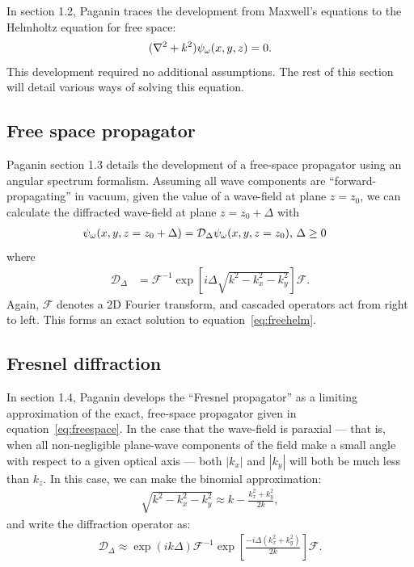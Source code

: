 \documentclass{article}
\begin{document}
In section 1.2, Paganin traces the development from Maxwell's equations to the
Helmholtz equation for free space:
\begin{align}
  (\nabla^2 + k^2)\psi_{\omega}(x,y,z) = 0.
  \label{eq:freehelm}
\end{align}
This development required no additional assumptions. The rest of this
section will detail various ways of solving this equation.

\subsection{Free space propagator}\label{freespace}
Paganin section 1.3 details the development of a free-space propagator using an
angular spectrum formalism. Assuming all wave components are
``forward-propagating'' in vacuum, given the value of a wave-field at plane
$z=z_0$, we can calculate the diffracted wave-field at plane $z=z_0 + \Delta$ with
\begin{align}
  \label{eq:propagated}
  \psi_{\omega}(x,y,z=z_0 + \Delta) &= \mathcal{D}_{\Delta}\psi_{\omega}(x,y,z=z_0) \text{,  } \Delta \ge 0
\end{align}
where
\begin{align}
  \mathcal{D}_{\Delta} &= \mathcal{F}^{-1}\exp\left[i\Delta\sqrt{k^2 - k_x^2 - k_y^2}\right]\mathcal{F}.\label{eq:freespace}
\end{align}
Again, $\mathcal{F}$ denotes a 2D Fourier transform, and cascaded operators act
from right to left. This forms an exact solution to equation~\ref{eq:freehelm}.

\subsection{Fresnel diffraction}
In section 1.4, Paganin develops the ``Fresnel propagator'' as a limiting
approximation of the exact, free-space propagator given in
equation~\ref{eq:freespace}. In the case that the wave-field is
paraxial --- that is, when all non-negligible plane-wave components of
the field make a small angle with respect to a given optical axis --- both
$|k_x|$ and $|k_y|$ will both be much less than $k_z$. In this case,
we can make the binomial approximation:
\begin{align}
  \sqrt{k^2 - k_x^2 - k_y^2} \approx k - \frac{k_x^2 + k_y^2}{2k},
\end{align}
and write the diffraction operator as:
\begin{align}
  \mathcal{D}_{\Delta} \approx \exp\left(ik\Delta\right)\mathcal{F}^{-1}\exp\left[\frac{-i\Delta\left(k_x^2 + k_y^2\right)}{2k}\right]\mathcal{F}.
  \label{eq:fresnel}
\end{align}
\end{document}
